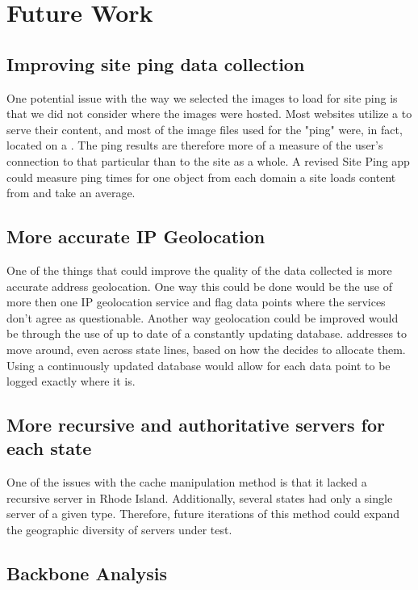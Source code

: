 \section{Future Work}

\subsection{Improving site ping data collection}

One potential issue with the way we selected the images to load for site ping is that we did not consider where the images were hosted. Most websites utilize a \cdn to serve their content, and most of the image files used for the "ping" were, in fact, located on a \cdn. The ping results are therefore more of a measure of the user's connection to that particular \cdn than to the site as a whole. A revised Site Ping app could measure ping times for one object from each domain a site loads content from and take an average.

\subsection{More accurate IP Geolocation}

One of the things that could improve the quality of the data collected is more accurate \ip address geolocation. One way this could be done would be the use of more then one IP geolocation service and flag data points where the services don't agree as questionable. Another way geolocation could be improved would be through the use of up to date of a constantly updating database. \ip addresses to move around, even across state lines, based on how the \isp decides to allocate them. Using a continuously updated database would allow for each data point to be logged exactly where it is.

\subsection{More recursive and authoritative servers for each state}

One of the issues with the \dns cache manipulation method is that it lacked a recursive \dns server in Rhode Island. Additionally, several states had only a single server of a given type. Therefore, future iterations of this method could expand the geographic diversity of servers under test.

\subsection{Backbone Analysis}

